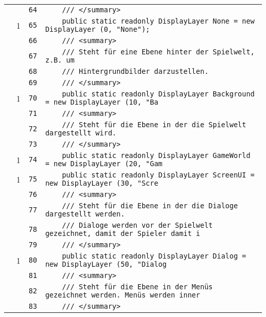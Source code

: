 \documentclass[a4paper,10pt]{article}
\begin{document}
\begin{longtable}[l]{lrrl}
\cellcolor{gray} &  & \verb~64~ & \verb~    /// </summary>~\\
\cellcolor{green} & 1 & \verb~65~ & \verb~    public static readonly DisplayLayer None = new DisplayLayer (0, "None");~\\
\cellcolor{gray} &  & \verb~66~ & \verb~    /// <summary>~\\
\cellcolor{gray} &  & \verb~67~ & \verb~    /// Steht für eine Ebene hinter der Spielwelt, z.B. um~\\
\cellcolor{gray} &  & \verb~68~ & \verb~    /// Hintergrundbilder darzustellen.~\\
\cellcolor{gray} &  & \verb~69~ & \verb~    /// </summary>~\\
\cellcolor{green} & 1 & \verb~70~ & \verb~    public static readonly DisplayLayer Background = new DisplayLayer (10, "Ba~\\
\cellcolor{gray} &  & \verb~71~ & \verb~    /// <summary>~\\
\cellcolor{gray} &  & \verb~72~ & \verb~    /// Steht für die Ebene in der die Spielwelt dargestellt wird.~\\
\cellcolor{gray} &  & \verb~73~ & \verb~    /// </summary>~\\
\cellcolor{green} & 1 & \verb~74~ & \verb~    public static readonly DisplayLayer GameWorld = new DisplayLayer (20, "Gam~\\
\cellcolor{green} & 1 & \verb~75~ & \verb~    public static readonly DisplayLayer ScreenUI = new DisplayLayer (30, "Scre~\\
\cellcolor{gray} &  & \verb~76~ & \verb~    /// <summary>~\\
\cellcolor{gray} &  & \verb~77~ & \verb~    /// Steht für die Ebene in der die Dialoge dargestellt werden.~\\
\cellcolor{gray} &  & \verb~78~ & \verb~    /// Dialoge werden vor der Spielwelt gezeichnet, damit der Spieler damit i~\\
\cellcolor{gray} &  & \verb~79~ & \verb~    /// </summary>~\\
\cellcolor{green} & 1 & \verb~80~ & \verb~    public static readonly DisplayLayer Dialog = new DisplayLayer (50, "Dialog~\\
\cellcolor{gray} &  & \verb~81~ & \verb~    /// <summary>~\\
\cellcolor{gray} &  & \verb~82~ & \verb~    /// Steht für die Ebene in der Menüs gezeichnet werden. Menüs werden inner~\\
\cellcolor{gray} &  & \verb~83~ & \verb~    /// </summary>~\\

\end{longtable}
\end{document}
